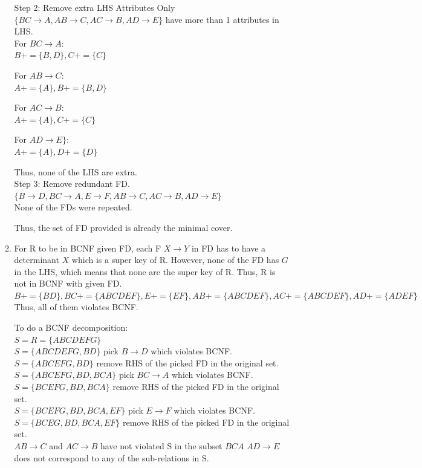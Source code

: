 \documentclass{article}
\begin{document}
\begin{enumerate}
\begin{enumerate}
        Step 2: Remove extra LHS Attributes
        Only $\{BC \rightarrow A, AB \rightarrow C, AC \rightarrow B, AD \rightarrow E\}$ have more than 1 attributes in LHS.\\
        For $BC \rightarrow A$:\\
        $B+ = \{B, D\}, C+ =\{C\}$
        
        For $AB \rightarrow C$:\\
        $A+ =\{A\}, B+ = \{B, D\}$
        
        For $AC \rightarrow B$:\\
        $A+ =\{A\}, C+ =\{C\}$
        
        For $AD \rightarrow E\}$:\\
        $A+ =\{A\}, D+ =\{D\}$
        
        Thus, none of the LHS are extra.\\
        
        Step 3: Remove redundant FD.\\
        $\{ B \rightarrow D, BC \rightarrow A, E \rightarrow F, AB \rightarrow C, AC \rightarrow B, AD \rightarrow E\}$\\
        None of the FDs were repeated.
        
        Thus, the set of FD provided is already the minimal cover.
        
        \item For R to be in BCNF given FD, each F $X \rightarrow Y$ in FD has to have a determinant $X$ which is a super key of R. However, none of the FD has $G$ in the LHS, which means that none are the super key of R. Thus, R is not in BCNF with given FD.\\
        
        $B+ =\{BD\}, BC+ = \{ABCDEF\}, E+ = \{EF\}, AB+ = \{ABCDEF\}, AC+ = \{ABCDEF\}, AD+ = \{ADEF\}$\\
        Thus, all of them violates BCNF.
        
        
        To do a BCNF decomposition:\\
        $S = R = \{ABCDEFG\}$\\
        $S = \{ABCDEFG, BD\}$ pick $B \rightarrow D$ which violates BCNF.\\
        $S = \{ABCEFG, BD\}$ remove RHS of the picked FD in the original set.\\
        $S = \{ABCEFG, BD, BCA\}$ pick $BC \rightarrow A$ which violates BCNF.\\
        $S = \{BCEFG, BD, BCA\}$ remove RHS of the picked FD in the original set.\\
        $S = \{BCEFG, BD, BCA, EF\}$ pick $E \rightarrow F$ which violates BCNF.\\
        $S = \{BCEG, BD, BCA, EF\}$ remove RHS of the picked FD in the original set.\\
        $AB \rightarrow C$ and $AC \rightarrow B$ have not violated S in the subset ${BCA}$
        $AD \rightarrow E$ does not correspond to any of the sub-relations in S.
        

\end{enumerate}
\end{enumerate}
\end{document}
